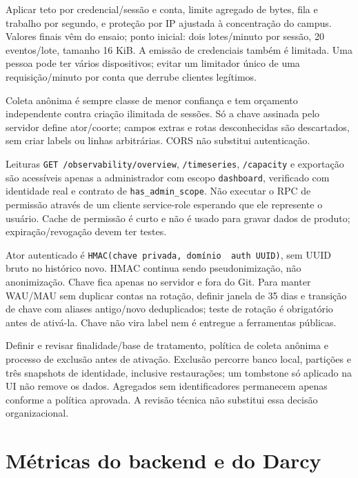 \documentclass[10pt,a4paper]{article}
\begin{document}
Aplicar teto por credencial/sessão e conta, limite agregado de bytes,
fila e trabalho por segundo, e proteção por IP ajustada à concentração
do campus. Valores finais vêm do ensaio; ponto inicial: dois
lotes/minuto por sessão, 20 eventos/lote, tamanho 16 KiB. A emissão de
credenciais também é limitada. Uma pessoa pode ter vários dispositivos;
evitar um limitador único de uma requisição/minuto por conta que derrube
clientes legítimos.

Coleta anônima é sempre classe de menor confiança e tem orçamento
independente contra criação ilimitada de sessões. Só a chave assinada
pelo servidor define ator/coorte; campos extras e rotas desconhecidas
são descartados, sem criar labels ou linhas arbitrárias. CORS não
substitui autenticação.

Leituras {\footnotesize\ttfamily\nolinkurl{GET}\ \nolinkurl{/observability/overview}}, {\footnotesize\ttfamily\nolinkurl{/timeseries}},
{\footnotesize\ttfamily\nolinkurl{/capacity}} e exportação são acessíveis apenas a administrador
com escopo {\footnotesize\ttfamily\nolinkurl{dashboard}}, verificado com identidade real e contrato
de {\footnotesize\ttfamily\nolinkurl{has_admin_scope}}. Não executar o RPC de permissão através
de um cliente service-role esperando que ele represente o usuário. Cache
de permissão é curto e não é usado para gravar dados de produto;
expiração/revogação devem ter testes.

Ator autenticado é
\texttt{HMAC(chave\ privada,\ domínio\ \textbar{}\textbar{}\ auth\ UUID)},
sem UUID bruto no histórico novo. HMAC continua sendo pseudonimização,
não anonimização. Chave fica apenas no servidor e fora do Git. Para
manter WAU/MAU sem duplicar contas na rotação, definir janela de 35 dias
e transição de chave com aliases antigo/novo deduplicados; teste de
rotação é obrigatório antes de ativá-la. Chave não vira label nem é
entregue a ferramentas públicas.

Definir e revisar finalidade/base de tratamento, política de coleta
anônima e processo de exclusão antes de ativação. Exclusão percorre
banco local, partições e três snapshots de identidade, inclusive
restaurações; um tombstone só aplicado na UI não remove os dados.
Agregados sem identificadores permanecem apenas conforme a política
aprovada. A revisão técnica não substitui essa decisão organizacional.

\clearpage
\section{Métricas do backend e do
Darcy}\label{muxe9tricas-do-backend-e-do-darcy}
\end{document}
